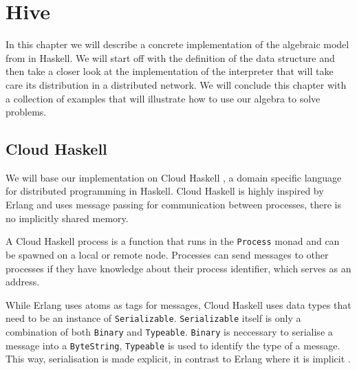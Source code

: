 \chapter{Hive}
In this chapter we will describe a concrete implementation of the algebraic model from  in Haskell. We will start off with the definition of the data structure and then take a closer look at the implementation of the interpreter that will take care its distribution in a distributed network. We will conclude this chapter with a collection of examples that will illustrate how to use our algebra to solve problems.

\section{Cloud Haskell}
We will base our implementation on \textsf{Cloud Haskell} \cite{Epstein:2011:THC:2034675.2034690}, a domain specific language for distributed programming in Haskell. Cloud Haskell is highly inspired by Erlang and uses message passing for communication between processes, there is no implicitly shared memory.

A Cloud Haskell process is a function that runs in the \texttt{Process} monad and can be spawned on a local or remote node. Processes can send messages to other processes if they have knowledge about their process identifier, which serves as an address.

While Erlang uses atoms as tags for messages, \textsf{Cloud Haskell} uses data types that need to be an instance of \texttt{Serializable}. \texttt{Serializable} itself is only a combination of both \texttt{Binary} and \texttt{Typeable}. \texttt{Binary} is neccessary to serialise a message into a \texttt{ByteString}, \texttt{Typeable} is used to identify the type of a message. This way, serialisation is made explicit, in contrast to Erlang where it is implicit \cite{Epstein:2011:THC:2034675.2034690}.

